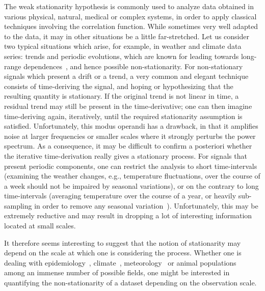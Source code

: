 \documentclass[aps,pra,groupedaddress,notitlepage]{revtex4-1}
\begin{document}
The weak stationarity hypothesis is commonly used to analyze data obtained in various physical, natural, medical or complex systems, in order to apply classical techniques involving the correlation function. While sometimes very well adapted to the data, it may in other situations be a little far-stretched. Let us consider two typical situations which arise, for example, in weather and climate data series: trends and periodic evolutions, {which are known for leading towards long-range dependences~\cite{Beran:2013}, and hence possible non-stationarity}.
For non-stationary signals which present a drift or a trend, a very common and elegant technique consists of time-deriving the signal, and hoping or hypothesizing that the resulting quantity is stationary. If the original trend is not linear in time, a residual trend may still be present in the time-derivative; one can then imagine time-deriving again, iteratively, until the required stationarity assumption is satisfied. Unfortunately, this modus operandi has a drawback, in that it amplifies noise at larger frequencies or smaller scales where it strongly perturbs the power spectrum. As a consequence, it may be difficult to confirm a posteriori whether the iterative time-derivation really gives a stationary process.
For signals that present periodic components, one can restrict the analysis to short time-intervals (examining the weather changes, e.g., temperature fluctuations, over the course of a week should not be impaired by seasonal variations), or on the contrary to long time-intervals (averaging temperature over the course of a year, or heavily sub-sampling  in order to remove any seasonal variation~\cite{Benoit2018}). Unfortunately, this may be extremely reductive and may result in dropping a lot of interesting information located at small scales.

It therefore seems interesting to suggest that the notion of stationarity may depend on the scale at which one is considering the process. Whether one is dealing with epidemiology~\cite{Cazelles2018}, climate~\cite{Cheng2014}, meteorology~\cite{Benoit2018} or animal populations~\cite{Szuwalski2016} among an immense number of possible fields, one might be interested in quantifying the non-stationarity of a dataset depending on the observation scale.

\end{document}
